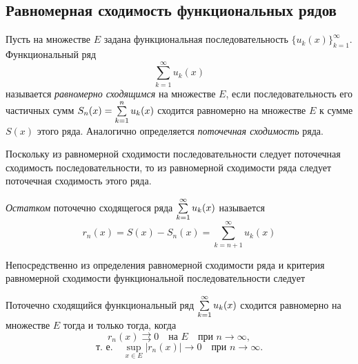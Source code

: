 \subsection{Равномерная сходимость функциональных рядов}

\begin{defn}
	Пусть на множестве $E$ задана функциональная последовательность $\{u_k(x)\}_{k=1}^\infty$.
	Функциональный ряд
	\begin{equation}
		\label{ch12:p2:eq:fun_series}
		\sum_{k=1}^{\infty} u_k(x)
	\end{equation}
	называется \textit{равномерно сходящимся} на множестве $E$, если последовательность его
	частичных сумм $S_n(x) = \sum_{k=1}^{n}\limits u_k(x)$ сходится равномерно на множестве $E$
	к сумме $S(x)$ этого ряда. Аналогично определяется \textit{поточечная сходимость} ряда.
\end{defn}

Поскольку из равномерной сходимости последовательности следует поточечная сходимость последовательности,
то из равномерной сходимости ряда следует поточечная сходимость этого ряда.

\begin{defn}
	\textit{Остатком} поточечно сходящегося ряда $\sum_{k=1}^{\infty}\limits u_k(x)$ называется
	$$
		r_n(x) = S(x) - S_n(x) = \sum_{k=n+1}^{\infty} u_k(x)
	$$
\end{defn}

Непосредственно из определения равномерной сходимости ряда и критерия равномерной сходимости
функциональной последовательности следует

\begin{thm}
	\label{ch12:th:ce_series_criteria}
	Поточечно сходящийся функциональный ряд $\sum_{k=1}^{\infty}\limits u_k(x)$ сходится
	равномерно на множестве $E$ тогда и только тогда, когда
	$$
		r_n(x) \rightrightarrows 0 \quad \text{на } E \quad \text{при } n \to \infty,
	$$
	$$
		\text{т. е.} \quad \sup_{x \in E} |r_n(x)| \to 0 \quad \text{при } n \to \infty.
	$$
\end{thm}

